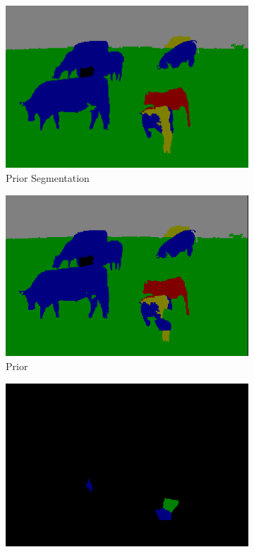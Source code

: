 \documentclass{article} %
\begin{document}
\begin{figure}[htb]
	\begin{subfigure}[t]{0.33\textwidth}
		\centering
		\includegraphics[width = \textwidth]{./img/1_11_s_prior.png}
		\parbox{0.95\textwidth}{\caption{Prior Segmentation \label{fig:prior_good}}}
	\end{subfigure}
	\begin{subfigure}[t]{0.33\textwidth}
		\centering
		\includegraphics[width = \textwidth]{./img/1_11_s_final.png}
		\parbox{0.95\textwidth}{\caption{Prior \label{fig:final_good}}}
	\end{subfigure}
	\begin{subfigure}[t]{0.33\textwidth}
		\centering
		\includegraphics[width = \textwidth]{./img/1_11_s_changed.png}

\end{subfigure}
\end{figure}
\end{document}
